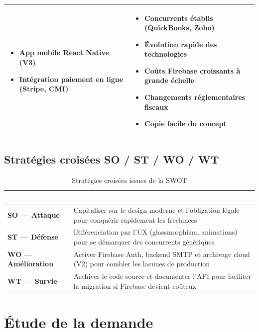 \documentclass[12pt,a4paper]{report}
\begin{document}
\begin{table}[H]
\begin{tabular}{|p{}|p{}|}
\begin{itemize}[leftmargin=*, noitemsep]
    \item App mobile React Native (V3)
    \item Intégration paiement en ligne (Stripe, CMI)
\end{itemize}
&
\begin{itemize}[leftmargin=*, noitemsep]
    \item Concurrents établis (QuickBooks, Zoho)
    \item Évolution rapide des technologies
    \item Coûts Firebase croissants à grande échelle
    \item Changements réglementaires fiscaux
    \item Copie facile du concept
\end{itemize}
\\
\hline
\end{tabular}
\end{table}

\subsection{Stratégies croisées SO / ST / WO / WT}

\begin{table}[H]
\centering
\caption{Stratégies croisées issues de la SWOT}
\label{tab:strategies_swot}
\begin{tabularx}{\textwidth}{|l|X|}
\hline
\rowcolor{emsiblue}\textcolor{white}{\textbf{Stratégie}} & \textcolor{white}{\textbf{Action concrète}} \\
\hline
\textbf{SO — Attaque} & Capitaliser sur le design moderne et l'obligation légale pour conquérir rapidement les freelances \\
\textbf{ST — Défense} & Différenciation par l'UX (glassmorphism, animations) pour se démarquer des concurrents génériques \\
\textbf{WO — Amélioration} & Activer Firebase Auth, backend SMTP et archivage cloud (V2) pour combler les lacunes de production \\
\textbf{WT — Survie} & Archiver le code source et documenter l'API pour faciliter la migration si Firebase devient coûteux \\
\hline
\end{tabularx}
\end{table}

\section{Étude de la demande}
\end{document}
